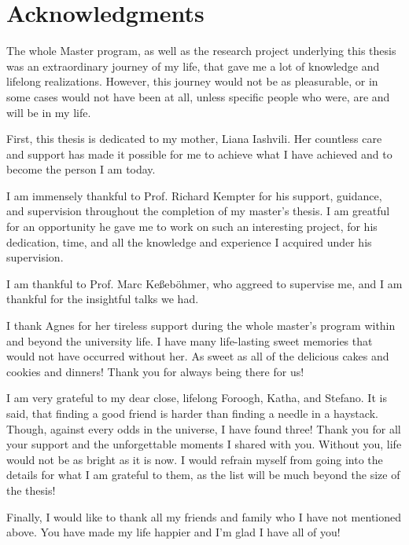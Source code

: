 \documentclass[../main.tex]{subfiles}
\begin{document}
\section*{Acknowledgments}

The whole Master program, as well as the research project underlying this thesis
was an extraordinary journey of my life, that gave me a lot of knowledge and lifelong
realizations. However, this journey would not be as pleasurable, or in some cases would not have been at all, unless specific people who were, are and will be in my life.

\vspace*{0.3cm}
First, this thesis is dedicated to my mother, Liana Iashvili. Her countless care and support has made it possible for me to achieve what I have achieved and to become the person I am today.

\vspace*{0.3cm}
I am immensely thankful to Prof. Richard Kempter for his support, guidance, and supervision throughout the completion of my master's thesis. I am greatful for an opportunity he gave me to work on such an interesting project, for his dedication, time, and all the knowledge and experience I acquired under his supervision. 

I am thankful to Prof. Marc Keßeböhmer, who aggreed to supervise me, and I am thankful for the insightful talks we had.

I thank Agnes for her tireless support during the whole master's program within and beyond the university life. I have many life-lasting sweet memories that would not have occurred without her. 
As sweet as all of the delicious cakes and cookies and dinners!
Thank you for always being there for us!

I am very grateful to my dear close, lifelong Foroogh, Katha, and Stefano. It is said, that finding a good friend is harder than finding a needle in a haystack. Though, against every odds in the universe, I have found three! Thank you for all your support and the unforgettable moments I shared with you. Without you, life would not be as bright as it is now. I would refrain myself from going into the details for what I am grateful to them, as the list will be much beyond the size of the thesis!

Finally, I would like to thank all my friends and family who I have not mentioned above. You have made my life happier and I'm glad I have all of you!
\end{document}
